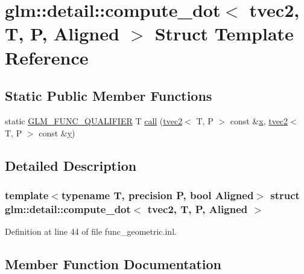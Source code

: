 \hypertarget{structglm_1_1detail_1_1compute__dot_3_01tvec2_00_01_t_00_01_p_00_01_aligned_01_4}{}\section{glm\+::detail\+::compute\+\_\+dot$<$ tvec2, T, P, Aligned $>$ Struct Template Reference}
\label{structglm_1_1detail_1_1compute__dot_3_01tvec2_00_01_t_00_01_p_00_01_aligned_01_4}
\subsection*{Static Public Member Functions}
\begin{DoxyCompactItemize}
\item 
static \mbox{\hyperlink{setup_8hpp_a33fdea6f91c5f834105f7415e2a64407}{G\+L\+M\+\_\+\+F\+U\+N\+C\+\_\+\+Q\+U\+A\+L\+I\+F\+I\+ER}} T \mbox{\hyperlink{structglm_1_1detail_1_1compute__dot_3_01tvec2_00_01_t_00_01_p_00_01_aligned_01_4_aab7e677d1e8f1a9935637fb6e8a4342d}{call}} (\mbox{\hyperlink{structglm_1_1tvec2}{tvec2}}$<$ T, P $>$ const \&\mbox{\hyperlink{glad_8h_a92d0386e5c19fb81ea88c9f99644ab1d}{x}}, \mbox{\hyperlink{structglm_1_1tvec2}{tvec2}}$<$ T, P $>$ const \&\mbox{\hyperlink{glad_8h_a66ddd433d2cacfe27f5906b7e86faeed}{y}})
\end{DoxyCompactItemize}


\subsection{Detailed Description}
\subsubsection*{template$<$typename T, precision P, bool Aligned$>$\newline
struct glm\+::detail\+::compute\+\_\+dot$<$ tvec2, T, P, Aligned $>$}



Definition at line 44 of file func\+\_\+geometric.\+inl.



\subsection{Member Function Documentation}
\mbox{\label{structglm_1_1detail_1_1compute__dot_3_01tvec2_00_01_t_00_01_p_00_01_aligned_01_4_aab7e677d1e8f1a9935637fb6e8a4342d}} 
